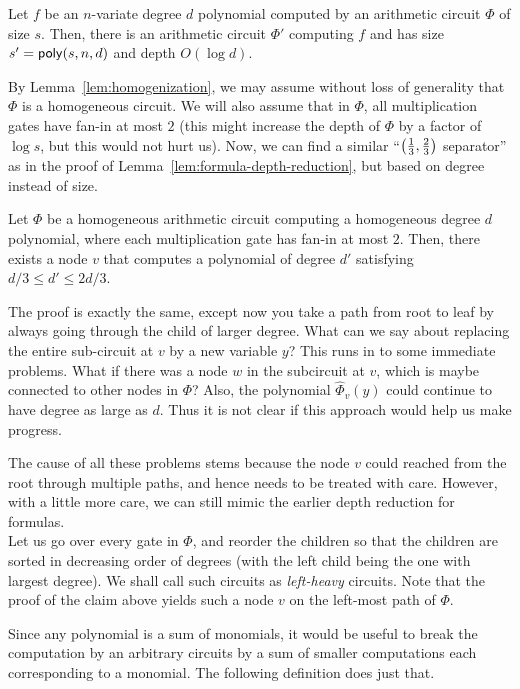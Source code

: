 \begin{theorem}\label{thm:vsbr}
Let $f$ be an $n$-variate degree $d$ polynomial computed by an arithmetic circuit $\Phi$ of size $s$. Then, there is an arithmetic circuit $\Phi'$ computing $f$ and has size $s' = \mathsf{poly}(s,n,d)$ and depth $O(\log d)$. 
\end{theorem}

By Lemma~\ref{lem:homogenization}, we may assume without loss of generality that $\Phi$ is a homogeneous circuit. We will also assume that in $\Phi$, all multiplication gates have fan-in at most $2$ (this might increase the depth of $\Phi$ by a factor of $\log s$, but this would not hurt us). Now, we can find a similar ``$\left(\frac{1}{3},\frac{2}{3}\right)$ separator'' as in the proof of Lemma~\ref{lem:formula-depth-reduction}, but based on degree instead of size. 

\begin{claim}
Let $\Phi$ be a homogeneous arithmetic circuit computing a homogeneous degree $d$ polynomial, where each multiplication gate has fan-in at most $2$. Then, there exists a node $v$ that computes a polynomial of degree $d'$ satisfying $d/3 \leq d' \leq 2d/3$. 
\end{claim}

The proof is exactly the same, except now you take a path from root to leaf by always going through the child of larger degree. What can we say about replacing the entire sub-circuit at $v$ by a new variable $y$? This runs in to some immediate problems. What if there was a node $w$ in the subcircuit at $v$, which is maybe connected to other nodes in $\Phi$? Also, the polynomial $\hat{\Phi}_v(y)$ could continue to have degree as large as $d$. Thus it is not clear if this approach would help us make progress. 

The cause of all these problems stems because the node $v$ could reached from the root through multiple paths, and hence needs to be treated with care. However, with a little more care, we can still mimic the earlier depth reduction for formulas. \\

Let us go over every gate in $\Phi$, and reorder the children so that the children are sorted in decreasing order of degrees (with the left child being the one with largest degree). We shall call such circuits as \emph{left-heavy} circuits. Note that the proof of the claim above yields such a node $v$ on the left-most path of $\Phi$. 

Since any polynomial is a sum of monomials, it would be useful to break the computation by an arbitrary circuits by a sum of smaller computations each corresponding to a monomial. The following definition does just that. 

